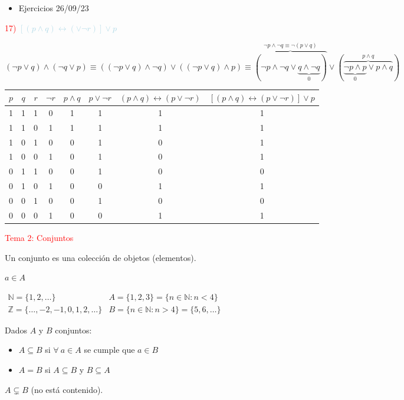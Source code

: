 \documentclass[12pt]{article}
\begin{document}
\begin{itemize}[label=\color{red}\textbullet, leftmargin=*]
	\item \color{lightblue}Ejercicios 26/09/23
\end{itemize}
\textcolor{red}{17) }\textcolor{lightblue}{$\left[(p\wedge q)\longleftrightarrow(\vee\neg r)\right]\vee p$}

$(\neg p\vee q)\wedge(\neg q\vee p)\equiv\left((\neg p\vee q)\wedge\neg q\right) \vee\left((\neg p\vee q)\wedge p\right)\equiv\overbrace{(\neg p\wedge\neg q\vee\underbrace{q\wedge \neg q}_{0})}^{\neg p\wedge\neg q\equiv\neg(p\vee q)}\vee(\overbrace{\underbrace{\neg p\wedge p}_{0}\vee p\wedge q}^{p\wedge q})$

\begin{center}
	\begin{tabular}{|c|c|c|c|c|c|c|c|}
		\hline
		\rowcolor{lightblue!50}
		\hline
		$p$ & $q$ & $r$ & $\neg r$ & $p\wedge q$ & $p\vee\neg r$ & $(p\wedge q)\longleftrightarrow (p\vee\neg r)$ & $[(p\wedge q)\longleftrightarrow (p\vee\neg r)]\vee p$ \\
		\hline
		1 & 1 & 1 & 0 & 1 & 1 & 1 & 1 \\
		\hline
		1 & 1 & 0 & 1 & 1 & 1 & 1 & 1 \\
		\hline
		1 & 0 & 1 & 0 & 0 & 1 & 0 & 1 \\
		\hline
		1 & 0 & 0 & 1 & 0 & 1 & 0 & 1 \\
		\hline
		0 & 1 & 1 & 0 & 0 & 1 & 0 & 0 \\
		\hline
		0 & 1 & 0 & 1 & 0 & 0 & 1 & 1 \\
		\hline
		0 & 0 & 1 & 0 & 0 & 1 & 0 & 0 \\
		\hline
		0 & 0 & 0 & 1 & 0 & 0 & 1 & 1 \\
		\hline
	\end{tabular}
\end{center}

\newpage

\textcolor{red}{Tema 2: Conjuntos}	

Un conjunto es una colección de objetos (elementos).

$a\in A$

$\begin{array}{ll}
	\mathbb{N}=\{1,2,\hdots\} & A=\{1,2,3\}=\{n\in\mathbb{N}:n<4\}\\
	\mathbb{Z}=\{\hdots,-2,-1,0,1,2,\hdots\} & B=\{n\in\mathbb{N}:n>4\}=\{5,6,\hdots\}
\end{array}$

Dados $A$ y $B$ conjuntos:
\begin{itemize}
	\item[] $A\subseteq B$ si $\forall~a\in A$ se cumple que $a\in B$
	\item[] $A=B$ si $A\subseteq B$ y $B\subseteq A$
\end{itemize}
$A\subsetneq B$ (no está contenido).
\end{document}
